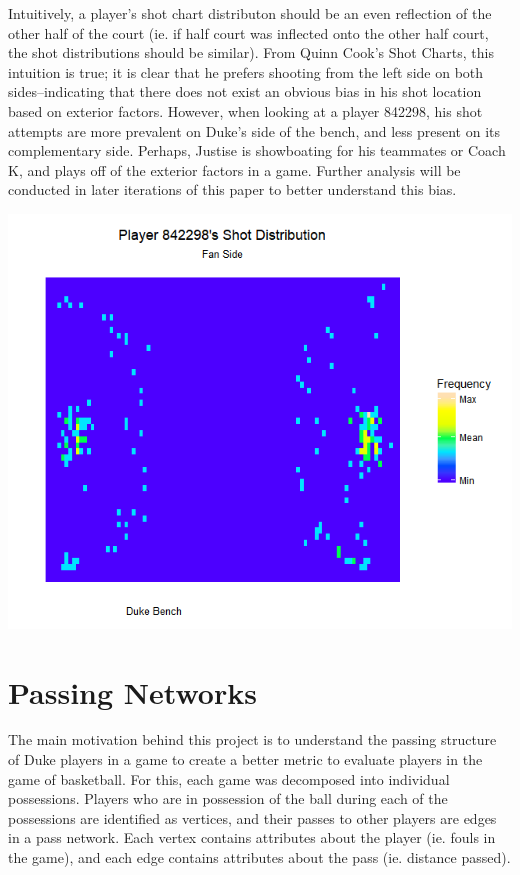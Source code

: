 \documentclass[12pt,twoside]{dukestatscithesis}
\theoremstyle{definition}
\theoremstyle{definition}
\theoremstyle{definition}
\theoremstyle{remark}
\begin{document}
Intuitively, a player's shot chart distributon should be an even
reflection of the other half of the court (ie. if half court was
inflected onto the other half court, the shot distributions should be
similar). From Quinn Cook's Shot Charts, this intuition is true; it is
clear that he prefers shooting from the left side on both
sides--indicating that there does not exist an obvious bias in his shot
location based on exterior factors. However, when looking at a player
842298, his shot attempts are more prevalent on Duke's side of the
bench, and less present on its complementary side. Perhaps, Justise is
showboating for his teammates or Coach K, and plays off of the exterior
factors in a game. Further analysis will be conducted in later
iterations of this paper to better understand this bias.

\includegraphics{img/shotdistribution.png}

\chapter{Passing Networks}\label{passing-networks}

The main motivation behind this project is to understand the passing
structure of Duke players in a game to create a better metric to
evaluate players in the game of basketball. For this, each game was
decomposed into individual possessions. Players who are in possession of
the ball during each of the possessions are identified as vertices, and
their passes to other players are edges in a pass network. Each vertex
contains attributes about the player (ie. fouls in the game), and each
edge contains attributes about the pass (ie. distance passed).
\end{document}
